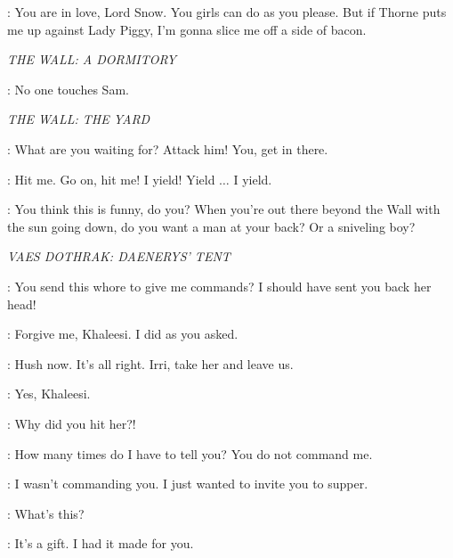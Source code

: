 \RAST: You are in love, Lord Snow. You girls can do as you please. But if Thorne puts me up against Lady Piggy, I'm gonna slice me off a side of bacon. 

\scene

\textit{THE WALL: A DORMITORY}


\JON: No one touches Sam. 

\scene

\textit{THE WALL: THE YARD}


\ALLISER: What are you waiting for?  Attack him!  You, get in there. 


\GRENN:  Hit me. Go on, hit me!   I yield! Yield $\ldots$ I yield. 

\ALLISER:  You think this is funny, do you? When you're out there beyond the Wall with the sun going down, do you want a man at your back? Or a sniveling boy? 


\scene

\textit{VAES DOTHRAK: DAENERYS' TENT}


\VISERYS: You send this whore to give me commands? I should have sent you back her head! 

\DOREAH: Forgive me, Khaleesi. I did as you asked. 

\DAENERYS: Hush now. It's all right. Irri, take her and leave us. 

\IRRI: Yes, Khaleesi. 

\DAENERYS: Why did you hit her?! 

\VISERYS: How many times do I have to tell you? You do not command me. 

\DAENERYS: I wasn't commanding you. I just wanted to invite you to supper. 

\VISERYS: What's this? 

\DAENERYS: It's a gift. I had it made for you. 

